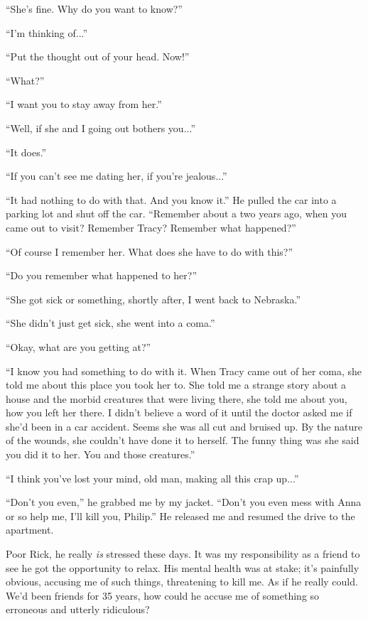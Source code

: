 ``She's fine. Why do you want to know?''

``I'm thinking of...''

``Put the thought out of your head. Now!''

``What?''

``I want you to stay away from her.''

``Well, if she and I going out bothers you...''

``It does.''

``If you can't see me dating her, if you're jealous...''

``It had nothing to do with that. And you know it.'' He pulled the car
into a parking lot and shut off the car. ``Remember about a two years
ago, when you came out to visit? Remember Tracy? Remember what
happened?''

``Of course I remember her. What does she have to do with this?''

``Do you remember what happened to her?''

``She got sick or something, shortly after, I went back to Nebraska.''

``She didn't just get sick, she went into a coma.''

``Okay, what are you getting at?''

``I know you had something to do with it. When Tracy came out of her
coma, she told me about this place you took her to. She told me a
strange story about a house and the morbid creatures that were living
there, she told me about you, how you left her there. I didn't believe a
word of it until the doctor asked me if she'd been in a car accident.
Seems she was all cut and bruised up. By the nature of the wounds, she
couldn't have done it to herself. The funny thing was she said you did
it to her. You and those creatures.''

``I think you've lost your mind, old man, making all this crap up...''

``Don't you even,'' he grabbed me by my jacket. ``Don't you even mess
with Anna or so help me, I'll kill you, Philip.'' He released me and
resumed the drive to the apartment.

Poor Rick, he really \emph{is} stressed these days. It was my
responsibility as a friend to see he got the opportunity to relax. His
mental health was at stake; it's painfully obvious, accusing me of such
things, threatening to kill me. As if he really could. We'd been friends
for 35 years, how could he accuse me of something so erroneous and
utterly ridiculous?

